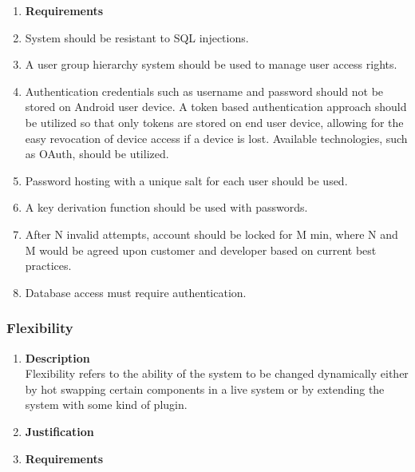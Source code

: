 \documentclass[a4paper,10pt]{article}
\begin{document}
\begin{enumerate}
			\item \textbf{Requirements}\\
				\item System should be resistant to SQL injections.
				\item A user group hierarchy system should be used to manage user access rights.
				\item Authentication credentials such as username and password should not be stored on Android user device. A token based authentication approach should be utilized so that only tokens are stored on end user device, allowing for the easy revocation of device access if a device is lost. Available technologies, such as OAuth, should be utilized.
				\item Password hosting with a unique salt for each user should be used.
				\item A key derivation function should be used with passwords. 
				\item After N invalid attempts, account should be locked for M min, where N and M would be agreed upon customer and developer based on current best practices.
				\item Database access must require authentication.
		\end{enumerate}

	\subsubsection{Flexibility}
		\begin{enumerate}
			\item \textbf{Description} \\
				Flexibility refers to the ability of the system to be changed dynamically either by hot swapping certain components in a live system or by extending the system with some kind of plugin. 

			\item \textbf{Justification} \\
			\item \textbf{Requirements}\\
		\end{enumerate}
\end{document}
